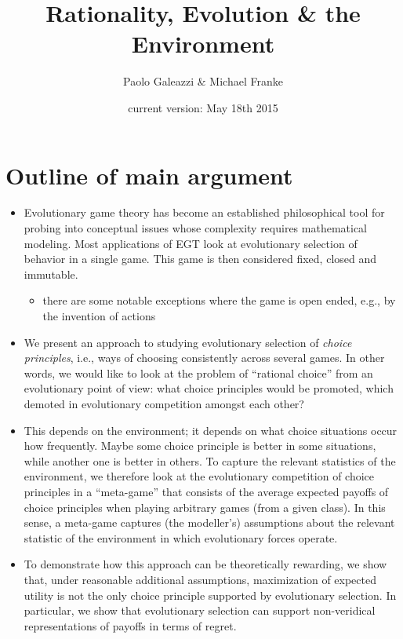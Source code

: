 \documentclass[fleqn,reqno,11pt]{article}
\title{Rationality, Evolution \& the Environment}
\author{Paolo Galeazzi \& Michael Franke}
\date{current version: May 18th 2015}
\begin{document}
\maketitle


\section*{Outline of main argument}


\begin{itemize}
\item Evolutionary game theory has become an established philosophical tool for probing into
  conceptual issues whose complexity requires mathematical modeling. Most applications of EGT
  look at evolutionary selection of behavior in a single game. This game is then considered
  fixed, closed and immutable.
  \begin{itemize}
  \item there are some notable exceptions where the game is open ended, e.g., by the invention
    of actions \citep{WordenLevin2007:Evolutionary-es, McKenzie-AlexanderSkymrs2012:Inventing-New-S}
  \end{itemize}

\item We present an approach to studying evolutionary selection of \emph{choice principles},
  i.e., ways of choosing consistently across several games. In other words, we would like to
  look at the problem of ``rational choice'' from an evolutionary point of view: what choice
  principles would be promoted, which demoted in evolutionary competition amongst each other?

\item This depends on the environment; it depends on what choice situations occur how
  frequently. Maybe some choice principle is better in some situations, while another one is
  better in others. To capture the relevant statistics of the environment, we therefore look at
  the evolutionary competition of choice principles in a ``meta-game'' that consists of the
  average expected payoffs of choice principles when playing arbitrary games (from a given
  class). In this sense, a meta-game captures (the modeller's) assumptions about the relevant
  statistic of the environment in which evolutionary forces operate.

\item To demonstrate how this approach can be theoretically rewarding, we show that, under
  reasonable additional assumptions, maximization of expected utility is not the only choice
  principle supported by evolutionary selection. In particular, we show that evolutionary
  selection can support non-veridical representations of payoffs in terms of regret. 


\end{itemize}
\end{document}
